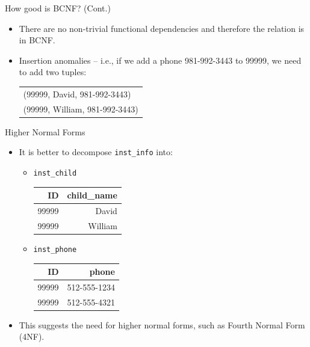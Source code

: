 \documentclass[aspectratio=169]{beamer}
\begin{document}
\begin{frame}{How good is BCNF? (Cont.)}
    \begin{itemize}
        \item There are no non-trivial functional dependencies and therefore the relation is in BCNF.
        \item Insertion anomalies -- i.e., if we add a phone 981-992-3443 to 99999, we need to add two tuples:
            \begin{center}
                \begin{tabular}{l}
                    (99999, David, 981-992-3443) \\
                    (99999, William, 981-992-3443)
                \end{tabular}
            \end{center}
    \end{itemize}
\end{frame}

\begin{frame}{Higher Normal Forms}
    \begin{itemize}
        \item It is better to decompose \texttt{inst\_info} into:
            \begin{itemize}
                \item \texttt{inst\_child}
                    \begin{center}
                        \begin{tabular}{r r}
                            \hline
                            \textbf{ID} & \textbf{child\_name} \\
                            \hline
                            99999 & David   \\
                            99999 & William \\
                            \hline
                        \end{tabular}
                    \end{center}
                \item \texttt{inst\_phone}
                    \begin{center}
                        \begin{tabular}{r r}
                            \hline
                            \textbf{ID} & \textbf{phone} \\
                            \hline
                            99999 & 512-555-1234 \\
                            99999 & 512-555-4321 \\
                            \hline
                        \end{tabular}
                    \end{center}
            \end{itemize}
        \item This suggests the need for higher normal forms, such as Fourth Normal Form (4NF).
    \end{itemize}
\end{frame}
\end{document}
